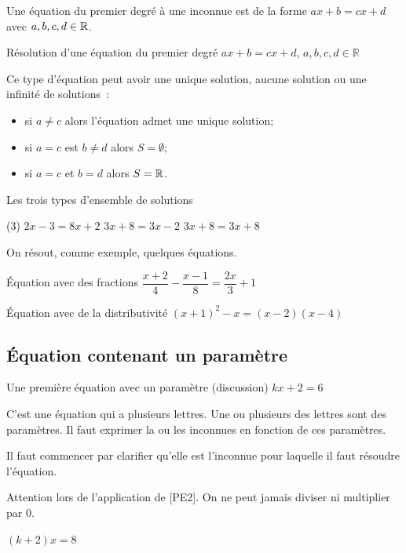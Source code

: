 \documentclass[a4paper,12pt]{article}
\begin{document}
Une équation du premier degré à une inconnue est de la forme $ax+b=cx+d$ avec $a,b,c,d\in \mathbb{R}$.
\begin{exemple}
	Résolution d'une équation du premier degré
	\tcblower
	$ax+b=cx+d,\, a,b,c,d\in\mathbb{R}$
\vspace{6.5cm}

\end{exemple}
Ce type d'équation peut avoir une unique solution, aucune solution ou une infinité de solutions~:
\begin{itemize}
	\item[] si $a\neq c$ alors l'équation admet une unique solution;
	\item[] si $a=c$ est $b\neq d$ alors $S=\emptyset$;
	\item[] si $a=c$ et $b=d$ alors $S=\mathbb{R}$.
\end{itemize}
\begin{exemple}
	Les trois types d'ensemble de solutions
	\tcblower
	\begin{tasks}(3)
		\task $2x-3=8x+2$
		\task $3x+8=3x-2$
		\task $3x+8=3x+8$
	\end{tasks}
\vspace{10cm}

\end{exemple}
\newpage
On résout, comme exemple, quelques équations.
\begin{exemple}
	Équation avec des fractions
	\tcblower
	$\dfrac{x+2}{4}-\dfrac{x-1}{8}=\dfrac{2x}{3}+1$
\vspace{9cm}

\end{exemple}
\begin{exemple}
	Équation avec de la distributivité
	\tcblower
	$(x+1)^2-x=(x-2)(x-4)$
\vspace{10cm}

\end{exemple}
\newpage
\subsection{Équation contenant un paramètre}
\begin{exemple}
	Une première équation avec un paramètre (discussion)
	\tcblower
	$kx+2=6$
	\vspace{8cm}

\end{exemple}
\begin{remarque}
	\tcblower
C'est une équation qui a plusieurs lettres. Une ou plusieurs des lettres sont des paramètres. Il faut exprimer la ou les inconnues en fonction de ces paramètres. 

Il faut commencer par clarifier qu'elle est l'inconnue pour laquelle il faut résoudre l'équation.

Attention lors de l'application de [PE2]. On ne peut jamais diviser ni multiplier par $0$. 

\end{remarque}
\begin{exemple}
$(k+2)x=8$
	\tcblower
	\vspace{6cm}

\end{exemple}
\end{document}
